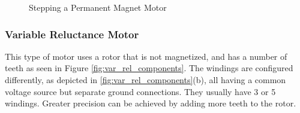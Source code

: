 \begin{figure}[htp]
    \begin{center}
    \hfill
    \hfill
  	\hfill
  	\caption{Stepping a Permanent Magnet Motor}
  	\label{fig:stepping_perm_magn}
    \end{center}
\end{figure}
\subsubsection{Variable Reluctance Motor}
This type of motor uses a rotor that is not magnetized, and has a number of teeth as seen in 
Figure \ref{fig:var_rel_components}. The windings are configured differently, as depicted in 
\ref{fig:var_rel_components}(b), all having a common voltage source but separate ground 
connections.
They usually have 3 or 5 windings.
Greater precision can be achieved by adding more teeth to the rotor.

